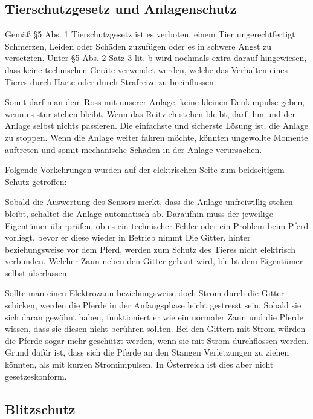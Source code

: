 \subsection{Tierschutzgesetz und Anlagenschutz}
\label{sec:tierschutzgesetzUndAnlagenschutz}

Gemäß §5 Abs. 1 Tierschutzgesetz ist es verboten, 
einem Tier ungerechtfertigt Schmerzen, Leiden oder Schäden zuzufügen oder es in schwere Angst zu versetzten. 
Unter §5 Abs. 2 Satz 3 lit. b wird nochmals extra darauf hingewiesen, dass keine technischen Geräte verwendet werden, welche das Verhalten eines Tieres durch Härte oder durch Strafreize zu beeinflussen. 

Somit darf man dem Ross mit unserer Anlage, keine kleinen Denkimpulse geben, wenn es stur stehen bleibt. Wenn das Reitvieh stehen bleibt, darf ihm und der Anlage selbst nichts passieren. Die einfachste und sicherste Lösung ist, die Anlage zu stoppen. Wenn die Anlage weiter fahren möchte, könnten ungewollte Momente auftreten und somit mechanische Schäden in der Anlage verursachen.

Folgende Vorkehrungen wurden auf der elektrischen Seite zum beidseitigem Schutz getroffen:

Sobald die Auswertung des Sensors merkt, dass die Anlage unfreiwillig stehen bleibt, schaltet die Anlage automatisch ab. Daraufhin muss der jeweilige Eigentümer überprüfen, ob es ein technischer Fehler oder ein Problem beim Pferd vorliegt, bevor er diese wieder in Betrieb nimmt
Die Gitter, hinter beziehungsweise vor dem Pferd, werden zum Schutz des Tieres nicht elektrisch verbunden.
Welcher Zaun neben den Gitter gebaut wird, bleibt dem Eigentümer selbst überlassen.

Sollte man einen Elektrozaun beziehungsweise doch Strom durch die Gitter schicken, werden die Pferde in der Anfangsphase leicht gestresst sein. Sobald sie sich daran gewöhnt haben, funktioniert er wie ein normaler Zaun und die Pferde wissen, dass sie diesen nicht berühren sollten.
Bei den Gittern mit Strom würden die Pferde sogar mehr geschützt werden, wenn sie mit Strom durchflossen werden. Grund dafür ist, dass sich die Pferde an den Stangen Verletzungen zu ziehen könnten, als mit kurzen Stromimpulsen. In Österreich ist dies aber nicht gesetzeskonform.

\subsection{Blitzschutz}
\label{sec:blitzschutz}

